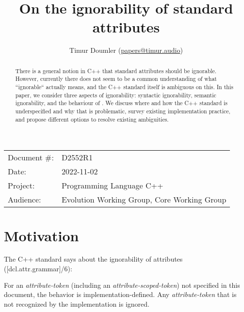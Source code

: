 

\newcommand{\forceindent}{\parindent=1em\indent\parindent=0pt\relax} %


\title{On the ignorability of standard attributes}
\author{
  Timur Doumler \small(\href{mailto:papers@timur.audio}{papers@timur.audio})
}
\date{}
\maketitle

\begin{tabular}{ll}
Document \#: & D2552R1 \\
Date: & 2022-11-02\\
Project: & Programming Language C++ \\
Audience: & Evolution Working Group, Core Working Group
\end{tabular}


\begin{abstract}
There is a general notion in C++ that standard attributes should be ignorable. However, currently there does not seem to be a common understanding of what ``ignorable`` actually means, and the C++ standard itself is ambiguous on this. In this paper, we consider three aspects of ignorability: syntactic ignorability, semantic ignorability, and the behaviour of \mbox{}. We discuss where and how the C++ standard is underspecified and why that is problematic, survey existing implementation practice, and propose different options to resolve existing ambiguities.
\end{abstract}


\section{Motivation}
\label{sec:motivation}


The C++ standard says about the ignorability of attributes ([dcl.attr.grammar]/6):

\begin{adjustwidth}{0.5cm}{0.5cm}
For an \emph{attribute-token} (including an \emph{attribute-scoped-token})  not specified in this document, the behavior is implementation-defined. Any \emph{attribute-token} that is not recognized by the implementation is ignored.
\end{adjustwidth}

